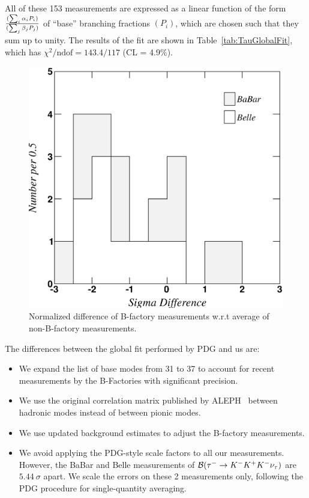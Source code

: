 \documentclass[fleqn,twoside]{article}
\begin{document}
All of these 153 measurements are expressed as a linear function
of the form $(\sum_i \alpha_i P_i )\over(\sum_j \beta_j P_j )$ 
of ``base'' branching fractions $(P_i)$, 
which are chosen such that they sum up to unity.
The results of the fit are shown in Table~\ref{tab:TauGlobalFit},
which has $\chi^2/\mathrm{ndof} = 143.4/117$ (CL = 4.9\%). 

\begin{figure}[!hbtp]
\begin{center}
\includegraphics[height=.4\textheight,width=.49\textwidth]{figures/compare_with_NoBB.eps}
\end{center}
\caption{Normalized difference of B-factory measurements w.r.t average of non-B-factory measurements.}
\label{fig:comp_NoBB}
\end{figure}
 
The differences between the global fit performed by PDG and us are:
\begin{itemize}
\item We expand the list of base modes from 31 to 37 to account for recent
  measurements by the B-Factories with significant precision.
\item We use the original correlation matrix published by
 ALEPH~\cite{Schael:2005am} between hadronic modes instead of between
 pionic modes.
\item We use updated background estimates to adjust the B-factory measurements.
\item We avoid applying the PDG-style scale factors to all our measurements.
However, the BaBar and Belle measurements of ${\cal{B}}({\tau^- \to
  K^-K^+K^-\nu_\tau})$ are $5.44~\sigma$ apart. We scale the errors on
these 2 measurements only, following the PDG procedure for
single-quantity averaging.
\end{itemize}
\end{document}
